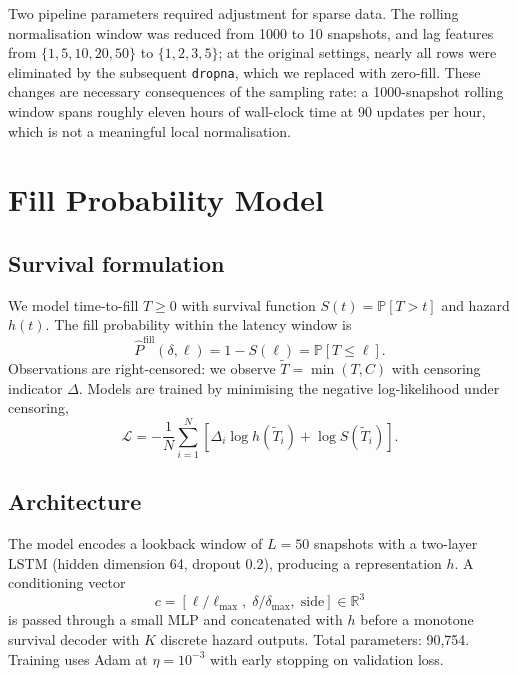 \documentclass[11pt]{article}
\begin{document}
Two pipeline parameters required adjustment for sparse data. The rolling
normalisation window was reduced from 1000 to 10 snapshots, and lag features
from $\{1,5,10,20,50\}$ to $\{1,2,3,5\}$; at the original settings, nearly all
rows were eliminated by the subsequent \texttt{dropna}, which we replaced with
zero-fill. These changes are necessary consequences of the sampling rate: a
1000-snapshot rolling window spans roughly eleven hours of wall-clock time at 90
updates per hour, which is not a meaningful local normalisation.

\section{Fill Probability Model}
\label{sec:model}

\subsection{Survival formulation}

We model time-to-fill $T \geq 0$ with survival function
$S(t) = \mathbb{P}[T > t]$ and hazard $h(t)$. The fill probability within the
latency window is
\begin{equation}
\widehat{P}^{\text{fill}}(\delta, \ell) = 1 - S(\ell) = \mathbb{P}[T \leq \ell].
\end{equation}
Observations are right-censored: we observe $\widetilde{T} = \min(T, C)$ with
censoring indicator $\Delta$. Models are trained by minimising the negative
log-likelihood under censoring,
\begin{equation}
\mathcal{L} = -\frac{1}{N}\sum_{i=1}^{N}
\left[ \Delta_i \log h(\widetilde{T}_i) + \log S(\widetilde{T}_i) \right].
\end{equation}

\subsection{Architecture}

The model encodes a lookback window of $L = 50$ snapshots with a two-layer LSTM
(hidden dimension 64, dropout 0.2), producing a representation $h$. A
conditioning vector
\begin{equation}
c = \left[ \ell / \ell_{\max}, \; \delta / \delta_{\max}, \; \text{side} \right]
\in \mathbb{R}^3
\end{equation}
is passed through a small MLP and concatenated with $h$ before a monotone
survival decoder with $K$ discrete hazard outputs. Total parameters: 90{,}754.
Training uses Adam at $\eta = 10^{-3}$ with early stopping on validation loss.
\end{document}
